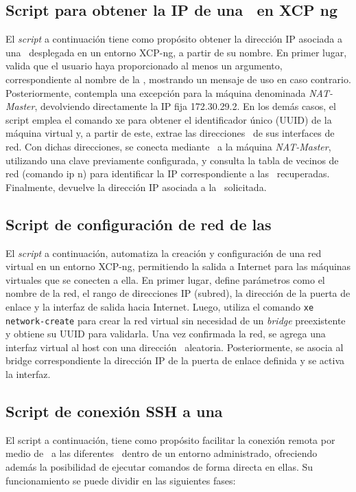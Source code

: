 \subsection{Script para obtener la IP de una \VM\ en XCP ng}
\noindent
El \textit{script} a continuación tiene como propósito obtener la dirección IP asociada a una \VM\ desplegada en un entorno XCP-ng, a partir de su nombre. En primer lugar, valida que el usuario haya proporcionado al menos un argumento, correspondiente al nombre de la \VM, mostrando un mensaje de uso en caso contrario. Posteriormente, contempla una excepción para la máquina denominada \textit{NAT-Master}, devolviendo directamente la IP fija 172.30.29.2. En los demás casos, el script emplea el comando xe para obtener el identificador único (UUID) de la máquina virtual y, a partir de este, extrae las direcciones \MAC\ de sus interfaces de red. Con dichas direcciones, se conecta mediante \SSH\ a la máquina \textit{NAT-Master}, utilizando una clave previamente configurada, y consulta la tabla de vecinos de red (comando ip n) para identificar la IP correspondiente a las \MAC\ recuperadas. Finalmente, devuelve la dirección IP asociada a la \VM\ solicitada. \\




\subsection{Script de configuración de red de las \VM}
\noindent
El \textit{script} a continuación, automatiza la creación y configuración de una red virtual en un entorno XCP-ng, permitiendo la salida a Internet para las máquinas virtuales que se conecten a ella. En primer lugar, define parámetros como el nombre de la red, el rango de direcciones IP (subred), la dirección de la puerta de enlace y la interfaz de salida hacia Internet. Luego, utiliza el comando \texttt{xe network-create} para crear la red virtual sin necesidad de un \textit{bridge} preexistente y obtiene su UUID para validarla. Una vez confirmada la red, se agrega una interfaz virtual al host con una dirección \MAC\ aleatoria. Posteriormente, se asocia al bridge correspondiente la dirección IP de la puerta de enlace definida y se activa la interfaz.
\noindent


\subsection{Script de conexión SSH a una \VM}
\noindent
El script a continuación, tiene como propósito facilitar la conexión remota por medio de \SSH\ a las diferentes \VM\ dentro de un entorno administrado, ofreciendo además la posibilidad de ejecutar comandos de forma directa en ellas. Su funcionamiento se puede dividir en las siguientes fases:


